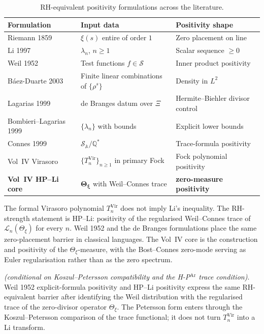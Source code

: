 \begin{table}[h]
\centering
\small
\begin{tabular}{l|l|l}
Formulation & Input data & Positivity shape \\
\hline
Riemann 1859 & \(\xi(s)\) entire of order \(1\) & Zero placement on line\\
Li 1997 & \(\lambda_{n}\), \(n\geq 1\) & Scalar sequence \(\geq 0\)\\
Weil 1952 & Test functions \(f\in\mathcal{S}\) & Inner product positivity\\
B\'aez-Duarte 2003 & Finite linear combinations of \(\{\rho^{s}\}\) & Density in \(L^{2}\)\\
Lagarias 1999 & de Branges datum over \(\Xi\) & Hermite--Biehler divisor control\\
Bombieri--Lagarias 1999 & \(\{\lambda_{n}\}\) with bounds & Explicit lower bounds\\
Connes 1999 & \(\mathcal{S}_{\mathbb{A}}/\mathbb{Q}^{*}\) & Trace-formula positivity\\
Vol~IV Virasoro & \(\{T_{n}^{\mathrm{Vir}}\}_{n\geq 1}\) in primary Fock & Fock polynomial positivity\\
\textbf{Vol~IV HP--Li core} & \(\boldsymbol{\Theta_{\xi}}\) with Weil--Connes trace & \textbf{zero-measure positivity}\\
\end{tabular}
\caption{RH-equivalent positivity formulations across the literature.}
\label{v4-arith:vb:tbl:comparison}
\end{table}

\begin{remark}
\label{v4-arith:vb:rem:placement}
The formal Virasoro polynomial \(T_{n}^{\mathrm{Vir}}\) does not
imply Li's inequality. The RH-strength statement is HP--Li:
positivity of the regularised Weil--Connes trace of
\(\mathcal L_n(\Theta_{\xi})\) for every \(n\). Weil 1952 and the
de Branges formulations place the same zero-placement barrier in
classical languages. The Vol~IV core is the construction and
positivity of the \(\Theta_{\xi}\)-measure, with the Bost--Connes
zero-mode serving as Euler regularisation rather than as the zero
spectrum.
\end{remark}

\begin{proposition}
\label{v4-arith:vb:prop:weil-equivalence}
\ClaimStatusProvedHere \emph{(conditional on Koszul--Petersson
compatibility  and the
H-P\(^{\mathrm{Ar}}\) trace condition)}. Weil 1952 explicit-formula
positivity and HP--Li positivity express the same RH-equivalent
barrier after identifying the Weil distribution with the regularised
trace of the zero-divisor operator \(\Theta_{\xi}\). The Petersson form enters
through the Koszul--Petersson comparison of the trace functional; it
does not turn \(T_{n}^{\mathrm{Vir}}\) into a Li transform.
\end{proposition}

